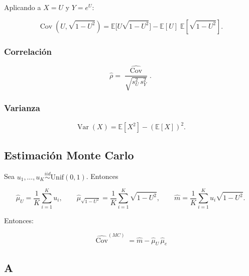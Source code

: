 \documentclass[10pt,a4paper]{article} %
\begin{document}
Aplicando a \(X=U\) y \(Y=e^{U}\):

\[
\operatorname{Cov}(U,\sqrt{1-U^2})=\mathbb{E}\!\big[U \sqrt{1-U^2}]-\mathbb{E}[U]\;\mathbb{E}[\sqrt{1-U^2}].
\]

    \hypertarget{correlaciuxf3n}{%
\subsubsection{Correlación}\label{correlaciuxf3n}}

\[
\widehat\rho=\dfrac{\widehat{\operatorname{Cov}}}{\sqrt{s_U^2\,s_Y^2}}.
\]

    \hypertarget{varianza}{%
\subsubsection{Varianza}\label{varianza}}

\[
\operatorname{Var}(X)=\mathbb{E}[X^{2}]-(\mathbb{E}[X])^{2}.
\]

    \hypertarget{estimaciuxf3n-monte-carlo}{%
\subsection{Estimación Monte Carlo}\label{estimaciuxf3n-monte-carlo}}

Sea \(u_1,\dots,u_K\stackrel{iid}{\sim}\mathrm{Unif}(0,1)\). Entonces

\[
\widehat{\mu}_U=\frac{1}{K}\sum_{i=1}^{K} u_i,\qquad
\widehat{\mu}_{\sqrt{1-U^2}}=\frac{1}{K}\sum_{i=1}^{K} \sqrt{1-U^2},\qquad
\widehat{m}=\frac{1}{K}\sum_{i=1}^{K} u_i \sqrt{1-U^2}.
\]

Entonces:

\[
\;\widehat{\operatorname{Cov}}^{(MC)}=\widehat{m}-\widehat{\mu}_U\,\widehat{\mu}_{e}\;
\]

    \hypertarget{a}{%
\subsection{A}\label{a}}
\end{document}
